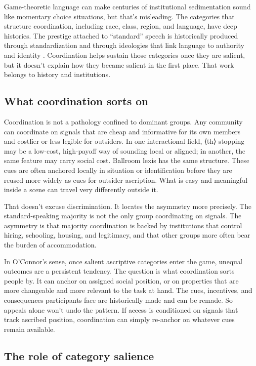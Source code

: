 \documentclass[11pt,letterpaper]{article}
\begin{document}
Game-theoretic language can make centuries of institutional sedimentation sound like momentary choice situations, but that's misleading. The categories that structure coordination, including race, class, region, and language, have deep histories. The prestige attached to \enquote{standard} speech is historically produced through standardization and through ideologies that link language to authority and identity \citep{Joseph1987,Joseph2004,milroy1999}. Coordination helps sustain those categories once they are salient, but it doesn't explain how they became salient in the first place. That work belongs to history and institutions.

\subsection{What coordination sorts on}

Coordination is not a pathology confined to dominant groups. Any community can coordinate on signals that are cheap and informative for its own members and costlier or less legible for outsiders. In one interactional field, ⟨th⟩-stopping may be a low-cost, high-payoff way of sounding local or aligned; in another, the same feature may carry social cost. Ballroom lexis has the same structure. These cues are often anchored locally in situation or identification before they are reused more widely as cues for outsider ascription. What is easy and meaningful inside a scene can travel very differently outside it.

That doesn't excuse discrimination. It locates the asymmetry more precisely. The standard-speaking majority is not the only group coordinating on signals. The asymmetry is that majority coordination is backed by institutions that control hiring, schooling, housing, and legitimacy, and that other groups more often bear the burden of accommodation.

In O'Connor's sense, once salient ascriptive categories enter the game, unequal outcomes are a persistent tendency. The question is what coordination sorts people by. It can anchor on assigned social position, or on properties that are more changeable and more relevant to the task at hand. The cues, incentives, and consequences participants face are historically made and can be remade. So appeals alone won't undo the pattern. If access is conditioned on signals that track ascribed position, coordination can simply re-anchor on whatever cues remain available.

\subsection{The role of category salience}
\end{document}
